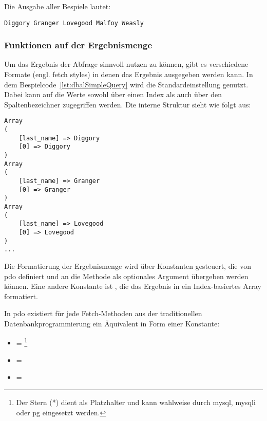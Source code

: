 Die Ausgabe aller Bespiele lautet:
\begin{Verbatim}
Diggory Granger Lovegood Malfoy Weasly
\end{Verbatim}

\subsubsection{Funktionen auf der Ergebnismenge}
\label{basics:doctrine:subsubsec:resultSet}
Um das Ergebnis der Abfrage sinnvoll nutzen zu können, gibt es verschiedene Formate (engl. fetch styles) in denen das Ergebnis ausgegeben werden kann. In dem Bespielcode~\ref{lst:dbalSimpleQuery} wird die Standardeinstellung  genutzt. Dabei kann auf die Werte sowohl über einen Index als auch über den Spaltenbezeichner zugegriffen werden. Die interne Struktur sieht wie folgt aus:

\begin{listing}[H]
\caption{}
\label{lst:internalStructureOfFetchBoth}
\end{listing}

\begin{Verbatim}
Array
(
    [last_name] => Diggory
    [0] => Diggory
)
Array
(
    [last_name] => Granger
    [0] => Granger
)
Array
(
    [last_name] => Lovegood
    [0] => Lovegood
)
...
\end{Verbatim}

Die Formatierung der Ergebnismenge wird über Konstanten gesteuert, die von \gls{pdo} definiert und an die Methode  als optionales Argument übergeben werden können. Eine andere Konstante ist , die das Ergebnis in ein Index-basiertes Array formatiert.

\begin{listing}[H]
\label{lst:fetchNum}
\end{listing}

In \gls{pdo} existiert für jede Fetch-Methoden aus der traditionellen Datenbankprogrammierung ein Äquivalent in Form einer Konstante:

\begin{itemize}
	\item {} = \footnote{Der Stern (*) dient als Platzhalter und kann wahlweise durch mysql, mysqli oder pg eingesetzt werden.}
	\item {} = 
	\item {} = 
\end{itemize}

